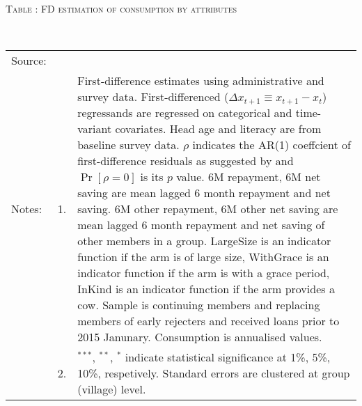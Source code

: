 \hspace{-1cm}\begin{minipage}[t]{14cm}
\hfil\textsc{\normalsize Table \thetable: FD estimation of consumption by attributes \label{tab FD consumption attributes original HH}}\\
\setlength{\tabcolsep}{1pt}
\setlength{\baselineskip}{8pt}
\renewcommand{\arraystretch}{.55}
\hfil{}\\
\renewcommand{\arraystretch}{.8}
\setlength{\tabcolsep}{1pt}
\begin{tabular}{>{\hfill\scriptsize}p{1cm}<{}>{\hfill\scriptsize}p{.25cm}<{}>{\scriptsize}p{12cm}<{\hfill}}
Source:& \multicolumn{2}{l}{\scriptsize Estimated with GUK administrative and survey data.}\\
Notes: & 1. & First-difference estimates using administrative and survey data. First-differenced ($\Delta x_{t+1}\equiv x_{t+1} - x_{t}$) regressands are regressed on categorical and time-variant covariates. Head age and literacy are from baseline survey data. $\rho$ indicates the AR(1) coeffcient of first-difference residuals as suggested by \citet[][10.71]{Wooldridge2010} and $\Pr[\rho=0]$ is its $p$ value. \textsf{6M repayment, 6M net saving} are mean lagged 6 month repayment and net saving. \textsf{6M other repayment, 6M other net saving} are mean lagged 6 month repayment and net saving of other members in a group. \textsf{LargeSize} is an indicator function if the arm is of large size, \textsf{WithGrace} is an indicator function if the arm is with a grace period, \textsf{InKind} is an indicator function if the arm provides a cow. Sample is continuing members and replacing members of early rejecters and received loans prior to 2015 Janunary. Consumption is annualised values. \\
& 2. & ${}^{***}$, ${}^{**}$, ${}^{*}$ indicate statistical significance at 1\%, 5\%, 10\%, respetively. Standard errors are clustered at group (village) level.
\end{tabular}
\end{minipage}


